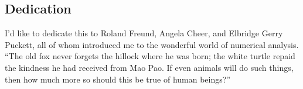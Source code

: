 \subsection*{Dedication}
I'd like to dedicate this to Roland Freund, Angela Cheer, and Elbridge
Gerry Puckett, all of whom introduced me to the wonderful world of
numerical analysis. ``The old fox never forgets the hillock where he was
born; the white turtle repaid the kindness he had received from Mao
Pao. If even animals will do such things, then how much more so should
this be true of human beings?''
